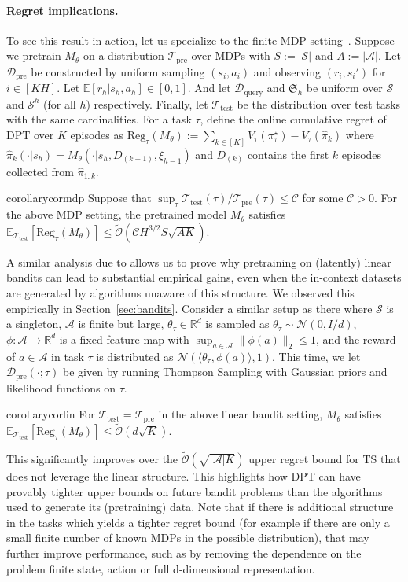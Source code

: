 \documentclass{article}
\newcommand{\Acal}{\mathcal{A}}
\newcommand{\Ccal}{\mathcal{C}}
\newcommand{\Dcal}{\mathcal{D}}
\newcommand{\Ncal}{\mathcal{N}}
\newcommand{\Ocal}{\mathcal{O}}
\newcommand{\Scal}{{\mathcal{S}}}
\newcommand{\Tcal}{{\mathcal{T}}}
\newcommand{\E}{\mathbb{E}}
\newcommand{\RR}{\mathbb{R}}
\newcommand{\Sfrak}{{\mathfrak{S}}}
\newcommand{\dotp}[2]{\langle{#1},{#2}\rangle}
\newcommand{\pretraind}{\Dcal_{\text{pre}}}
\newcommand{\pretraint}{\Tcal_{\text{pre}}}
\newcommand{\testt}{\Tcal_{\text{test}}}
\newcommand{\Dquery}{\Dcal_{\text{query}}}
\newcommand{\pistar}{\pi^{\star}}
\newcommand{\regret}{\text{Reg}}
\begin{document}
\paragraph{Regret implications.} To see this result in action, let us specialize to the finite MDP setting~\citep{osband2013more}. Suppose we pretrain $M_{\theta}$ on a distribution $\pretraint$ over MDPs with $S := |\Scal|$ and $A := |\Acal|$. Let $\pretraind$ be constructed by uniform sampling $(s_i, a_i)$ and observing $(r_i, s_i')$ for $i \in [KH]$. Let $\E\left[r_h | s_h, a_h\right] \in [0, 1]$. And let $\Dquery$ and $\Sfrak_h$ be uniform over $\Scal$ and $\Scal^h$ (for all $h$) respectively. Finally, let $\testt$ be the distribution over test tasks with the same cardinalities.
For a task $\tau$, define the online cumulative regret of DPT over $K$ episodes as   $\regret_\tau(M_{\theta}) := \sum_{k \in [K]} V_\tau(\pistar_\tau) - V_\tau(\hat \pi_k)$ where $\hat \pi_k(\cdot |s_h) = M_{\theta} (\cdot  | s_h, D_{(k - 1)}, \xi_{h - 1})$ and $D_{(k)}$ contains the first $k$ episodes collected from $\hat \pi_{1:k}$.
\begin{restatable}{corollary}{cormdp}
\label{cor:mdp}
    Suppose that $\sup_{\tau} {\testt(\tau)}/{\pretraint(\tau)} \leq \Ccal$ for some $\Ccal > 0$. For the above MDP setting, the pretrained model $M_{\theta}$ satisfies
   $\E_{\testt} \left[ \regret_\tau(M_{\theta}) \right]  \leq \widetilde{\Ocal} (  \Ccal H^{3/2}S\sqrt{ A K }) $.
\end{restatable}
A similar analysis due to \cite{russo2014learning} allows us to prove why pretraining on (latently) linear bandits can lead to substantial empirical gains, even when the in-context datasets are generated by algorithms unaware of this structure. We observed this empirically in Section~\ref {sec:bandits}. Consider a similar setup as there where $\Scal$ is a singleton, $\Acal$ is finite but large, $\theta_\tau \in \RR^d$ is sampled as $\theta_{\tau} \sim \Ncal(0, I/d)$,   $\phi: \Acal \to \RR^d$ is a fixed feature map with $\sup_{a \in \Acal} \| \phi(a) \|_2 \leq 1$, and the reward of $a \in \Acal$ in task $\tau$ is distributed as $\Ncal(\dotp{\theta_\tau}{\phi(a)}, 1)$.  This time, we let $\pretraind(\cdot ; \tau)$ be given by running Thompson Sampling with Gaussian priors and likelihood functions on $\tau$.
\begin{restatable}{corollary}{corlin}
\label{cor:lin} For $\testt = \pretraint$ in the above linear bandit setting, $M_{\theta}$ satisfies
   $\E_{\testt} \left[ \regret_\tau(M_{\theta}) \right]  \leq \widetilde{\Ocal} ( d\sqrt{   K }) $.
\end{restatable}
This significantly improves over the $\widetilde{\Ocal}(\sqrt{|\Acal| K } )$ upper regret bound for TS that does not leverage the linear structure. This highlights how DPT can have provably tighter upper bounds on future bandit problems than the algorithms used to generate its (pretraining) data. Note that if there is additional structure in the tasks which yields a tighter regret bound (for example if there are only a small finite number of known MDPs in the possible distribution), that may further improve performance, such as by removing the dependence on the problem finite state, action or full d-dimensional representation.
\end{document}
